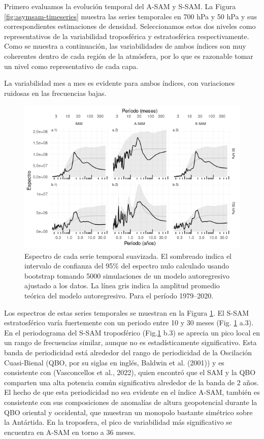 \documentclass[12pt,oneside]{reedthesis}
\begin{document}
Primero evaluamos la evolución temporal del A-SAM y S-SAM.
La Figura \ref{fig:asymsam-timeseries} muestra las series temporales en 700 hPa y 50 hPa y sus correspondientes estimaciones de densidad.
Seleccionamos estos dos niveles como representativos de la variabilidad troposférica y estratosférica respectivamente.
Como se muestra a continuación, las variabilidades de ambos índices son muy coherentes dentro de cada región de la atmósfera, por lo que es razonable tomar un nivel como representativo de cada capa.

La variabilidad mes a mes es evidente para ambos índices, con variaciones ruidosas en las frecuencias bajas.



\begin{figure}
\includegraphics{figures/30-sam/spectrum-1} \caption{Espectro de cada serie temporal suavizada. El sombreado indica el intervalo de confianza del 95\% del espectro nulo calculado usando bootstrap tomando 5000 simulaciones de un modelo autoregresivo ajustado a los datos. La línea gris indica la amplitud promedio teórica del modelo autoregresivo. Para el período 1979--2020.}\label{fig:spectrum}
\end{figure}

Los espectros de estas series temporales se muestran en la Figura \ref{fig:spectrum}.
El S-SAM estratosférico varía fuertemente con un periodo entre 10 y 30 meses (Fig. \ref{fig:spectrum} a.3).
En el periodograma del S-SAM troposférico (Fig.\ref{fig:spectrum} b.3) se aprecia un pico local en un rango de frecuencias similar, aunque no es estadísticamente significativo.
Esta banda de periodicidad está alrededor del rango de periodicidad de la Oscilación Cuasi-Bienal (QBO, por su siglas en inglés, Baldwin et al. (2001)) y es consistente con (Vasconcellos et al., 2022), quien encontró que el SAM y la QBO comparten una alta potencia común significativa alrededor de la banda de 2 años.
El hecho de que esta periodicidad no sea evidente en el índice A-SAM, también es consistente con sus composiciones de anomalías de altura geopotencial durante la QBO oriental y occidental, que muestran un monopolo bastante simétrico sobre la Antártida.
En la troposfera, el pico de variabilidad más significativo se encuentra en A-SAM en torno a 36 meses.
\end{document}
